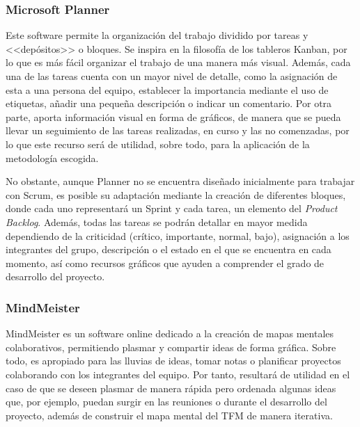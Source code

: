 \subsubsection{Microsoft Planner}
Este software \cite{microsoftplanner} permite la organización del trabajo dividido por tareas y <<depósitos>> o bloques. Se inspira en la filosofía de los tableros Kanban, por lo que es más fácil organizar el trabajo de una manera más visual. Además, cada una de las tareas cuenta con un mayor nivel de detalle, como la asignación de esta a una persona del equipo, establecer la importancia mediante el uso de etiquetas, añadir una pequeña descripción o indicar un comentario. Por otra parte, aporta información visual en forma de gráficos, de manera que se pueda llevar un seguimiento de las tareas realizadas, en curso y las no comenzadas, por lo que este recurso será de utilidad, sobre todo, para la aplicación de la metodología escogida.

No obstante, aunque Planner no se encuentra diseñado inicialmente para trabajar con Scrum, es posible su adaptación \cite{robertmulsow2018} mediante la creación de diferentes bloques, donde cada uno representará un Sprint y cada tarea, un elemento del \textit{Product Backlog}. Además, todas las tareas se podrán detallar en mayor medida dependiendo de la criticidad (crítico, importante, normal, bajo), asignación a los integrantes del grupo, descripción o el estado en el que se encuentra en cada momento, así como recursos gráficos que ayuden a comprender el grado de desarrollo del proyecto.

\subsubsection{MindMeister}
MindMeister \cite{mindmeister} es un software online dedicado a la creación de mapas mentales colaborativos, permitiendo plasmar y compartir ideas de forma gráfica. Sobre todo, es apropiado para las lluvias de ideas, tomar notas o planificar proyectos colaborando con los integrantes del equipo. Por tanto, resultará de utilidad en el caso de que se deseen plasmar de manera rápida pero ordenada algunas ideas que, por ejemplo, puedan surgir en las reuniones o durante el desarrollo del proyecto, además de construir el mapa mental del \acs{TFM} de manera iterativa.

